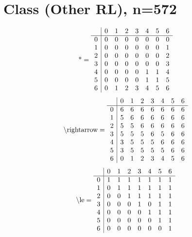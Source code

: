 \documentclass[11pt]{article}
\begin{document}
\section{Class (Other RL), n=572}
\[\text{*} = 
\begin{array}{r | r r r r r r r}
 & 0 & 1 & 2 & 3 & 4 & 5 & 6 \\ \hline
0 & 0 & 0 & 0 & 0 & 0 & 0 & 0 \\
1 & 0 & 0 & 0 & 0 & 0 & 0 & 1 \\
2 & 0 & 0 & 0 & 0 & 0 & 0 & 2 \\
3 & 0 & 0 & 0 & 0 & 0 & 0 & 3 \\
4 & 0 & 0 & 0 & 0 & 1 & 1 & 4 \\
5 & 0 & 0 & 0 & 0 & 1 & 1 & 5 \\
6 & 0 & 1 & 2 & 3 & 4 & 5 & 6 \\
\end{array}
\]
\[\text{\textbackslash rightarrow} = 
\begin{array}{r | r r r r r r r}
 & 0 & 1 & 2 & 3 & 4 & 5 & 6 \\ \hline
0 & 6 & 6 & 6 & 6 & 6 & 6 & 6 \\
1 & 5 & 6 & 6 & 6 & 6 & 6 & 6 \\
2 & 5 & 5 & 6 & 6 & 6 & 6 & 6 \\
3 & 5 & 5 & 5 & 6 & 5 & 6 & 6 \\
4 & 3 & 5 & 5 & 5 & 6 & 6 & 6 \\
5 & 3 & 5 & 5 & 5 & 5 & 6 & 6 \\
6 & 0 & 1 & 2 & 3 & 4 & 5 & 6 \\
\end{array}
\]
\[\text{\textbackslash le} = 
\begin{array}{r | r r r r r r r}
 & 0 & 1 & 2 & 3 & 4 & 5 & 6 \\ \hline
0 & 1 & 1 & 1 & 1 & 1 & 1 & 1 \\
1 & 0 & 1 & 1 & 1 & 1 & 1 & 1 \\
2 & 0 & 0 & 1 & 1 & 1 & 1 & 1 \\
3 & 0 & 0 & 0 & 1 & 0 & 1 & 1 \\
4 & 0 & 0 & 0 & 0 & 1 & 1 & 1 \\
5 & 0 & 0 & 0 & 0 & 0 & 1 & 1 \\
6 & 0 & 0 & 0 & 0 & 0 & 0 & 1 \\
\end{array}
\]
\end{document}
